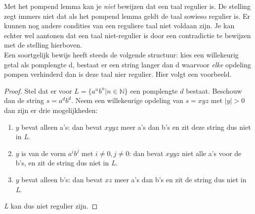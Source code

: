 Met het pompend lemma kan je \emph{niet} bewijzen dat een taal regulier is. De stelling zegt immers niet dat als het pompend lemma geldt de taal sowieso regulier is. Er kunnen nog andere condities van een reguliere taal niet voldaan zijn. Je kan echter wel aantonen dat een taal niet-regulier is door een contradictie te bewijzen met de stelling hierboven.\\

Een soortgelijk bewijs heeft steeds de volgende structuur: kies een willekeurig getal als pomplengte d, bestaat er een string langer dan d waarvoor \emph{elke} opdeling pompen verhinderd dan is deze taal nier regulier. Hier volgt een voorbeeld.

\begin{proof}
Stel dat er voor $L= \{a^nb^n | n \in \mathbb{N}\}$ een pomplengte $d$ bestaat. Beschouw dan de string $s=a^db^d$. Neem een willekeurige opdeling van $s=xyz$ met $|y| > 0$ dan zijn er drie mogelijkheden:
\begin{enumerate}
\item $y$ bevat alleen a's: dan bevat $xyyz$ meer a's dan b's en zit deze string dus niet in \emph{L}.
\item $y$ is van de vorm $a^ib^j$ met $i \neq 0, j \neq 0$: dan bevat $xyyz$ niet alle a's voor de b's, en zit de string dus niet in \emph{L}.
\item $y$ bevat alleen b's: dan bevat $xz$ meer a's dan b's en zit de string dus niet in \emph{L}.
\end{enumerate}
\emph{L} kan dus niet regulier zijn.
\end{proof}
